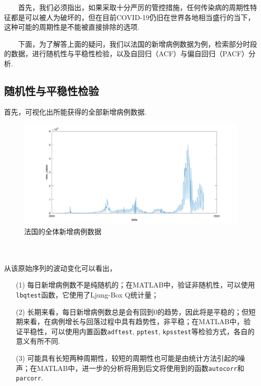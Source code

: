 \documentclass[a4paper, titlepage]{article}
\begin{document}
        　　首先，我们必须指出，如果采取十分严厉的管控措施，任何传染病的周期性特征都是可以被人为破坏的，但在目前COVID-19仍旧在世界各地相当盛行的当下，这种可能的周期性是不能被直接排除的选项.

        　　下面，为了解答上面的疑问，我们以法国的新增病例数据为例，检索部分时段的数据，进行随机性与平稳性检验，以及自回归（ACF）与偏自回归（PACF）分析. 

        \subsection{随机性与平稳性检验}
        首先，可视化出所能获得的全部新增病例数据.\\
\begin{minipage}{\textwidth}
\begin{figure}[H]
    \centering
    \includegraphics[width=\textwidth]{./images/France_Whole.png}
    \vspace{-3em}
    \caption{法国的全体新增病例数据}
    \label{images:France_Whole}
\end{figure}
\end{minipage}\\\quad\\
从该原始序列的波动变化可以看出，
\begin{enumerate}[itemsep=-2pt,topsep=1pt]
    \item [(1)] 每日新增病例数不是纯随机的；{\kaishu 在MATLAB中，验证非随机性，可以使用\texttt{lbqtest}函数，它使用了Ljung-Box Q统计量；}
    \item [(2)] 长期来看，每日新增病例数总是会有回到$0$的趋势，因此将是平稳的；但短期来看，在病例增长与回落过程中具有趋势性，非平稳；{\kaishu 在MATLAB中，验证平稳性，可以使用内置函数\texttt{adftest}, \texttt{pptest}, \texttt{kpsstest}等检验方式，各自的意义有所不同.}
    \item [(3)] 可能具有长短两种周期性，较短的周期性也可能是由统计方法引起的噪声；{\kaishu 在MATLAB中，进一步的分析将用到后文将使用到的函数\texttt{autocorr}和\texttt{parcorr}.}
\end{enumerate}
\end{document}
